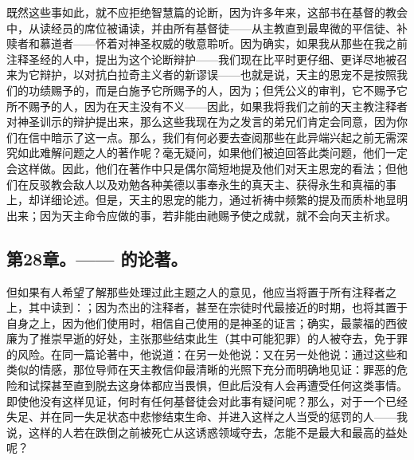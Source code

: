既然这些事如此，就不应拒绝智慧篇的论断，因为许多年来，这部书在基督的教会中，从读经员的席位被诵读，并由所有基督徒——从主教直到最卑微的平信徒、补赎者和慕道者——怀着对神圣权威的敬意聆听。因为确实，如果我从那些在我之前注释圣经的人中，提出为这个论断辩护——我们现在比平时更仔细、更详尽地被召来为它辩护，以对抗白拉奇主义者的新谬误——也就是说，天主的恩宠不是按照我们的功绩赐予的，而是白施予它所赐予的人，因为；但凭公义的审判，它不赐予它所不赐予的人，因为在天主没有不义——因此，如果我将我们之前的天主教注释者对神圣训示的辩护提出来，那么这些我现在为之发言的弟兄们肯定会同意，因为你们在信中暗示了这一点。那么，我们有何必要去查阅那些在此异端兴起之前无需深究如此难解问题之人的著作呢？毫无疑问，如果他们被迫回答此类问题，他们一定会这样做。因此，他们在著作中只是偶尔简短地提及他们对天主恩宠的看法；但他们在反驳教会敌人以及劝勉各种美德以事奉永生的真天主、获得永生和真福的事上，却详细论述。但是，天主的恩宠的能力，通过祈祷中频繁的提及而质朴地显明出来；因为天主命令应做的事，若非能由祂赐予使之成就，就不会向天主祈求。\par


\subsection{第28章。—— 的论著。}

但如果有人希望了解那些处理过此主题之人的意见，他应当将置于所有注释者之上，其中读到：；因为杰出的注释者，甚至在宗徒时代最接近的时期，也将其置于自身之上，因为他们使用时，相信自己使用的是神圣的证言；确实，最蒙福的西彼廉为了推崇早逝的好处，主张那些结束此生（其中可能犯罪）的人被夺去，免于罪的风险。在同一篇论著中，他说道：在另一处他说：又在另一处他说：通过这些和类似的情感，那位导师在天主教信仰最清晰的光照下充分而明确地见证：罪恶的危险和试探甚至直到脱去这身体都应当畏惧，但此后没有人会再遭受任何这类事情。即使他没有这样见证，何时有任何基督徒会对此事有疑问呢？那么，对于一个已经失足、并在同一失足状态中悲惨结束生命、并进入这样之人当受的惩罚的人——我说，这样的人若在跌倒之前被死亡从这诱惑领域夺去，怎能不是最大和最高的益处呢？\par

